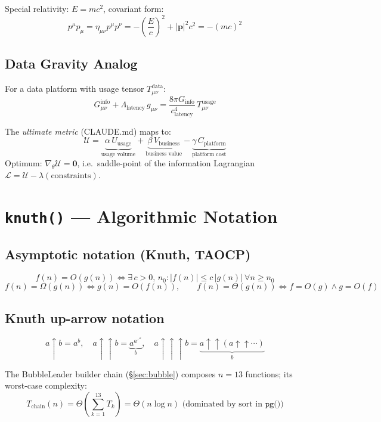 \documentclass[12pt,a4paper]{article}
\begin{document}
Special relativity: $E = mc^2$, covariant form:
\[
  p^\mu p_\mu = \eta_{\mu\nu} p^\mu p^\nu = -\left(\frac{E}{c}\right)^2 + |\mathbf{p}|^2 c^2 = -(mc)^2
\]

\subsection{Data Gravity Analog}

For a data platform with usage tensor $T_{\mu\nu}^{\text{data}}$:
\[
  G_{\mu\nu}^{\text{info}} + \Lambda_{\text{latency}}\, g_{\mu\nu}
  = \frac{8\pi G_{\text{info}}}{c_{\text{latency}}^4}\, T_{\mu\nu}^{\text{usage}}
\]

The \emph{ultimate metric} (CLAUDE.md) maps to:
\[
  \mathcal{U} = \underbrace{\alpha\, U_{\text{usage}}}_{\text{usage volume}}
              + \underbrace{\beta\, V_{\text{business}}}_{\text{business value}}
              - \underbrace{\gamma\, C_{\text{platform}}}_{\text{platform cost}}
\]
Optimum: $\nabla_\theta \mathcal{U} = \mathbf{0}$, i.e.\ saddle-point of the
information Lagrangian $\mathcal{L} = \mathcal{U} - \lambda(\text{constraints})$.

\section{\texttt{knuth()} — Algorithmic Notation}

\subsection{Asymptotic notation (Knuth, TAOCP)}

\[
  f(n) = O(g(n)) \iff \exists\, c{>}0,\, n_0 : |f(n)| \leq c\,|g(n)|\ \forall n \geq n_0
\]
\[
  f(n) = \Omega(g(n)) \iff g(n) = O(f(n)), \qquad
  f(n) = \Theta(g(n)) \iff f{=}O(g) \land g{=}O(f)
\]

\subsection{Knuth up-arrow notation}

\[
  a \uparrow b = a^b, \quad
  a \uparrow\uparrow b = \underbrace{a^{a^{\iddots^a}}}_{b}, \quad
  a \uparrow\uparrow\uparrow b = \underbrace{a \uparrow\uparrow (a \uparrow\uparrow \cdots)}_{b}
\]

The BubbleLeader builder chain (§\ref{sec:bubble}) composes
$n = 13$ functions; its worst-case complexity:
\[
  T_{\text{chain}}(n) = \Theta\!\left(\sum_{k=1}^{13} T_k\right)
  = \Theta(n \log n) \text{ (dominated by sort in } \texttt{pg()}\text{)}
\]
\end{document}
